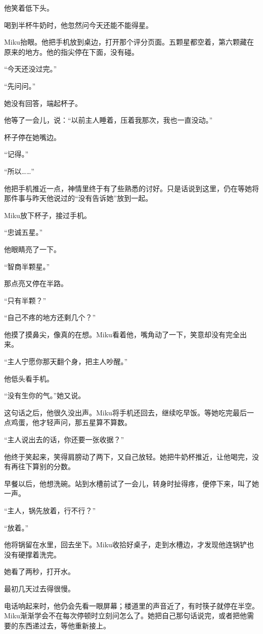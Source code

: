 他笑着低下头。

喝到半杯牛奶时，他忽然问今天还能不能得星。

Miku抬眼。他把手机放到桌边，打开那个评分页面。五颗星都空着，第六颗藏在原来的地方。他的指尖停在下面，没有碰。

“今天还没过完。”

“先问问。”

她没有回答，端起杯子。

他等了一会儿，说：“以前主人睡着，压着我那次，我也一直没动。”

杯子停在她嘴边。

“记得。”

“所以……”

他把手机推近一点，神情里终于有了些熟悉的讨好。只是话说到这里，仍在等她将那件事与昨天他说过的“没有告诉她”放到一起。

Miku放下杯子，接过手机。

“忠诚五星。”

他眼睛亮了一下。

“智商半颗星。”

那点亮又停在半路。

“只有半颗？”

“自己不疼的地方还剩几个？”

他摸了摸鼻尖，像真的在想。Miku看着他，嘴角动了一下，笑意却没有完全出来。

“主人宁愿你那天翻个身，把主人吵醒。”

他低头看手机。

“没有生你的气。”她又说。

这句话之后，他很久没出声。Miku将手机还回去，继续吃早饭。等她吃完最后一点鸡蛋，他才轻声问，那五星算不算数。

“主人说出去的话，你还要一张收据？”

他终于笑起来，笑得肩膀动了两下，又自己放轻。她把牛奶杯推近，让他喝完，没有再往下算别的分数。

早餐以后，他想洗碗。站到水槽前试了一会儿，转身时扯得疼，便停下来，叫了她一声。

“主人，锅先放着，行不行？”

“放着。”

他将锅留在水里，回去坐下。Miku收拾好桌子，走到水槽边，才发现他连锅铲也没有硬撑着洗完。

她看了两秒，打开水。

\SceneBreak

最初几天过去得很慢。

电话响起来时，他仍会先看一眼屏幕；楼道里的声音近了，有时筷子就停在半空。Miku渐渐学会不在每次停顿时立刻问怎么了。她把自己那句话说完，或者把他需要的东西递过去，等他重新接上。

